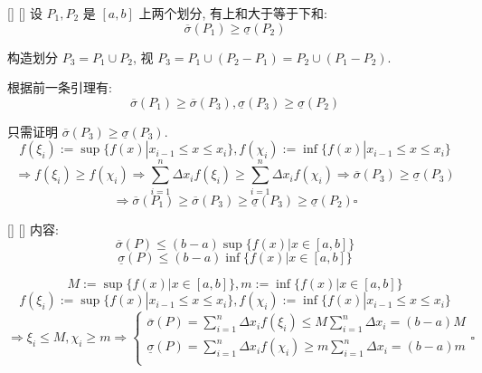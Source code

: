 \documentclass[UTF8]{ctexart}
\begin{document}
            \begin{ppt}
			    []
			    {}
			    []
			    []
                设 \(P_1, P_2\) 是 \([a,b]\) 上两个划分, 有上和大于等于下和: 
                \[\overline{\sigma}(P_1)\geq\underline{\sigma}(P_2)\]
            \end{ppt}

            \begin{prf}

                构造划分 \(P_3=P_1\cup P_2\), 视 \(P_3=P_1\cup(P_2-P_1)=P_2\cup(P_1-P_2)\). 
                
                根据前一条引理有: 
                \[\overline{\sigma}(P_1)\geq\overline{\sigma}(P_3), \underline{\sigma}(P_3)\geq\underline{\sigma}(P_2)\]

                只需证明 \(\overline{\sigma}(P_3)\geq\underline{\sigma}(P_3)\). 
                \[f(\xi_i):=\sup\{f(x)|x_{i-1}\leq x\leq x_i\}, f(\chi_i):=\inf\{f(x)|x_{i-1}\leq x\leq x_i\}\]
                \[\Longrightarrow f(\xi_i)\geq f(\chi_i)\Longrightarrow\sum_{i=1}^{n}\Delta x_if(\xi_i)\geq\sum_{i=1}^{n}\Delta x_if(\chi_i)\Longrightarrow\overline{\sigma}(P_3)\geq\underline{\sigma}(P_3)\]
                \[\Longrightarrow\overline{\sigma}(P_1)\geq\overline{\sigma}(P_3)\geq\underline{\sigma}(P_3)\geq\underline{\sigma}(P_2)\square\]
            \end{prf}
        
            \begin{ppt}
			    []
			    {}
			    []
			    []
                内容: 
                \[\overline{\sigma}(P)\leq(b-a)\sup\{f(x)|x\in[a,b]\}\]
                \[\underline{\sigma}(P)\leq(b-a)\inf\{f(x)|x\in[a,b]\}\]
            \end{ppt}

            \begin{prf}
                \[M:=\sup\{f(x)|x\in[a,b]\},m:=\inf\{f(x)|x\in[a,b]\}\]
                \[f(\xi_i):=\sup\{f(x)|x_{i-1}\leq x\leq x_i\}, f(\chi_i):=\inf\{f(x)|x_{i-1}\leq x\leq x_i\}\]
                \[\Longrightarrow\xi_i\leq M, \chi_i\geq m\Longrightarrow
                \begin{cases}
                    \overline{\sigma}(P)=\sum\limits_{i=1}^{n}\Delta x_if(\xi_i)\leq M\sum\limits_{i=1}^{n}\Delta x_i=(b-a)M\\
                    \underline{\sigma}(P)=\sum\limits_{i=1}^{n}\Delta x_if(\chi_i)\geq m\sum\limits_{i=1}^{n}\Delta x_i=(b-a)m\\
                \end{cases}\square\]
            \end{prf}
			
\end{document}
